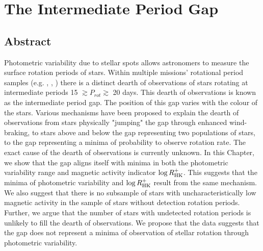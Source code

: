 

\newcommand\rper{$R_{\rm{per}}$}


\chapter{The Intermediate Period Gap}

\section*{Abstract}


Photometric variability due to stellar spots allows astronomers to measure the surface rotation periods of stars.
Within multiple missions' rotational period samples (e.g. \kepler, \ktoo, \ZTF) there is a distinct dearth of observations of stars rotating at intermediate periods 15 $\gtrsim P_{rot} \gtrsim$ 20 days.
This dearth of observations is known as the intermediate period gap.
The position of this gap varies with the colour of the stars.
Various mechanisms have been proposed to explain the dearth of observations from stars physically "jumping" the gap through enhanced wind-braking, to stars above and below the gap representing two populations of stars, to the gap representing a minima of probability to observe rotation rate.
The exact cause of the dearth of observations is currently unknown.
In this Chapter, we show that the gap aligns itself with minima in both the photometric variability range and magnetic activity indicator $\log R^{+}_{\rm{HK}}$.
This suggests that the minima of photometric variability and $\log R^{+}_{\rm{HK}}$ result from the same mechanism.
We also suggest that there is no subsample of stars with uncharacteristically low magnetic activity in the sample of stars without detection rotation periods.
Further, we argue that the number of stars with undetected rotation periods is unlikely to fill the dearth of observations.
We propose that the data suggests that the gap does not represent a minima of observation of stellar rotation through photometric variability.

\newpage

